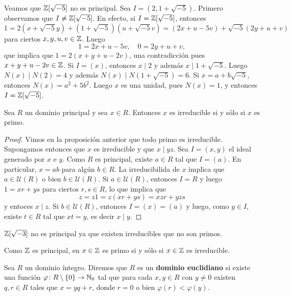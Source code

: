 \begin{example}
Veamos que $\mathbb{Z}[\sqrt{-5}]$ no es principal. Sea $I=(2,1+\sqrt{-5})$. Primero
observamos que $I\ne\mathbb{Z}[\sqrt{-5}]$. En efecto, si $I=\mathbb{Z}[\sqrt{-5}]$, entonces
\[
1=2(x+\sqrt{-5}y)+(1+\sqrt{-5})(u+\sqrt{-5}v)=(2x+u-5v)+\sqrt{-5}(2y+u+v)
\]
para ciertos $x,y,u,v\in\mathbb{Z}$. Luego
\[
1=2x+u-5v,\quad
0=2y+u+v,
\]
que implica que $1=2(x+y+u-2v)$, una contradicción pues $x+y+u-2v\in\mathbb{Z}$. 
Si $I=(x)$, entonces $x\mid 2$ y además $x\mid 1+\sqrt{-5}$. Luego
$N(x)\mid N(2)=4$ y además $N(x)\mid N(1+\sqrt{-5})=6$. Si $x=a+b\sqrt{-5}$, entonces $N(x)=a^2+5b^2$. 
Luego $x$ es una unidad, pues $N(x)=1$, y entonces $I=\mathbb{Z}[\sqrt{-5}]$.  
\end{example}

\begin{proposition}
Sea $R$ un dominio principal y sea $x\in R$. Entonces $x$ es irreducible si y sólo si $x$ es primo.
\end{proposition}

\begin{proof}
	Vimos en la proposición anterior que todo primo es irreducible. Supongamos entonces que $x$ es irreducible y
	que $x\mid yz$. Sea $I=(x,y)$ el ideal generado por $x$ e $y$. Como $R$ es principal, existe $a\in R$ tal que
	$I=(a)$. En particular, $x=ab$ para algún $b\in R$. La irreducibilida de $x$ implica que $a\in\mathcal{U}(R)$ o bien
	$b\in\mathcal{U}(R)$. Si $a\in\mathcal{U}(R)$, entonces $I=R$ y luego $1=xr+ys$ para ciertos $r,s\in R$, lo que 
	implica que
	\[
	z=z1=z(xr+ys)=xzr+yzs
	\]
	y entoces $x\mid z$. Si $b\in\mathcal{U}(R)$, entonces $I=(x)=(a)$ y luego, como $y\in I$, existe
	$t\in R$ tal que $xt=y$, es decir $x\mid y$. 	
\end{proof}
	
\begin{example}
$\mathbb{Z}[\sqrt{-3}]$ 
no es principal ya que existen irreducibles que no son primos.
\end{example}

\begin{example}
Como $\mathbb{Z}$ es principal, en $x\in \mathbb{Z}$ es primo si y sólo si $x\in\mathbb{Z}$ es irreducible.  
\end{example}

\begin{definition}
Sea $R$ un dominio íntegro. Diremos que $R$ es un \textbf{dominio euclidiano} 
si existe una función $\varphi\colon R\setminus\{0\}\to\mathbb{N}_0$ 
tal que para cada $x,y\in R$ con $y\ne0$ existen $q,r\in R$ tales que $x=yq+r$, donde $r=0$ o bien $\varphi(r)<\varphi(y)$.  
\end{definition}

